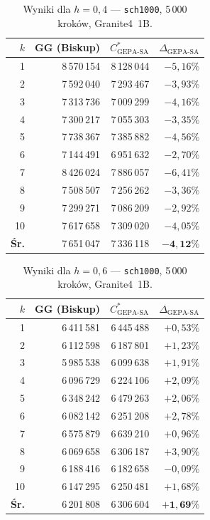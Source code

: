 \documentclass[11pt,a4paper]{article}
\begin{document}
\begin{table}[ht]
\centering
\caption{Wyniki dla $h = 0{,}4$ — \texttt{sch1000}, 5\,000 kroków, Granite4~1B.}
\label{tab:h04}
\begin{tabular}{@{}rrrr@{}}
\toprule
$k$ & GG (Biskup) & $C^*_{\text{GEPA-SA}}$ & $\Delta_{\text{GEPA-SA}}$ \\
\midrule
 1 &  8\,570\,154 &  8\,128\,044 & $-5{,}16\%$ \\
 2 &  7\,592\,040 &  7\,293\,467 & $-3{,}93\%$ \\
 3 &  7\,313\,736 &  7\,009\,299 & $-4{,}16\%$ \\
 4 &  7\,300\,217 &  7\,055\,303 & $-3{,}35\%$ \\
 5 &  7\,738\,367 &  7\,385\,882 & $-4{,}56\%$ \\
 6 &  7\,144\,491 &  6\,951\,632 & $-2{,}70\%$ \\
 7 &  8\,426\,024 &  7\,886\,057 & $-6{,}41\%$ \\
 8 &  7\,508\,507 &  7\,256\,262 & $-3{,}36\%$ \\
 9 &  7\,299\,271 &  7\,086\,209 & $-2{,}92\%$ \\
10 &  7\,617\,658 &  7\,309\,020 & $-4{,}05\%$ \\
\midrule
\textbf{Śr.} & 7\,651\,047 & 7\,336\,118 & $\mathbf{-4{,}12\%}$ \\
\bottomrule
\end{tabular}
\end{table}

\begin{table}[ht]
\centering
\caption{Wyniki dla $h = 0{,}6$ — \texttt{sch1000}, 5\,000 kroków, Granite4~1B.}
\label{tab:h06}
\begin{tabular}{@{}rrrr@{}}
\toprule
$k$ & GG (Biskup) & $C^*_{\text{GEPA-SA}}$ & $\Delta_{\text{GEPA-SA}}$ \\
\midrule
 1 & 6\,411\,581 & 6\,445\,488 & $+0{,}53\%$ \\
 2 & 6\,112\,598 & 6\,187\,801 & $+1{,}23\%$ \\
 3 & 5\,985\,538 & 6\,099\,638 & $+1{,}91\%$ \\
 4 & 6\,096\,729 & 6\,224\,106 & $+2{,}09\%$ \\
 5 & 6\,348\,242 & 6\,479\,263 & $+2{,}06\%$ \\
 6 & 6\,082\,142 & 6\,251\,208 & $+2{,}78\%$ \\
 7 & 6\,575\,879 & 6\,639\,210 & $+0{,}96\%$ \\
 8 & 6\,069\,658 & 6\,306\,187 & $+3{,}90\%$ \\
 9 & 6\,188\,416 & 6\,182\,658 & $-0{,}09\%$ \\
10 & 6\,147\,295 & 6\,250\,481 & $+1{,}68\%$ \\
\midrule
\textbf{Śr.} & 6\,201\,808 & 6\,306\,604 & $\mathbf{+1{,}69\%}$ \\
\bottomrule
\end{tabular}
\end{table}
\end{document}
